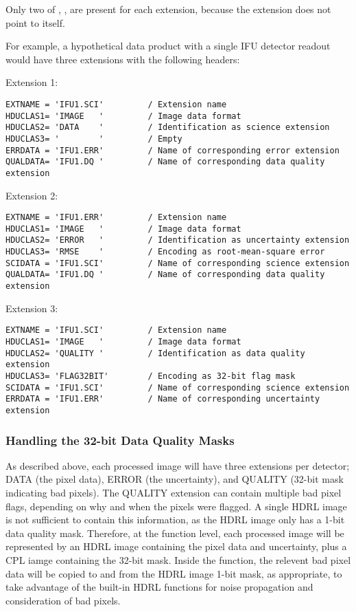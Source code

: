 Only two of , ,  are present for each
extension, because the extension does not point to itself.

For example, a hypothetical data product with a single \ac{IFU} detector
readout would have three extensions with the following headers:

Extension 1:
\begin{verbatim}
EXTNAME = 'IFU1.SCI'         / Extension name
HDUCLAS1= 'IMAGE   '         / Image data format
HDUCLAS2= 'DATA    '         / Identification as science extension
HDUCLAS3= '        '         / Empty
ERRDATA = 'IFU1.ERR'         / Name of corresponding error extension
QUALDATA= 'IFU1.DQ '         / Name of corresponding data quality extension
\end{verbatim}

Extension 2:
\begin{verbatim}
EXTNAME = 'IFU1.ERR'         / Extension name
HDUCLAS1= 'IMAGE   '         / Image data format
HDUCLAS2= 'ERROR   '         / Identification as uncertainty extension
HDUCLAS3= 'RMSE    '         / Encoding as root-mean-square error
SCIDATA = 'IFU1.SCI'         / Name of corresponding science extension
QUALDATA= 'IFU1.DQ '         / Name of corresponding data quality extension
\end{verbatim}

Extension 3:
\begin{verbatim}
EXTNAME = 'IFU1.SCI'         / Extension name
HDUCLAS1= 'IMAGE   '         / Image data format
HDUCLAS2= 'QUALITY '         / Identification as data quality extension
HDUCLAS3= 'FLAG32BIT'        / Encoding as 32-bit flag mask
SCIDATA = 'IFU1.SCI'         / Name of corresponding science extension
ERRDATA = 'IFU1.ERR'         / Name of corresponding uncertainty extension
\end{verbatim}


\subsubsection{Handling the 32-bit Data Quality Masks}
\label{sssec:metisimageformat}


As described above, each processed image will have three extensions per detector; DATA (the pixel data), ERROR (the uncertainty), and QUALITY (32-bit mask indicating bad pixels). The QUALITY extension can contain multiple bad pixel flags, depending on why and when the pixels were flagged.  A single HDRL image is not sufficient to contain this information, as the HDRL image only has a 1-bit data quality mask. Therefore, at the function level, each processed image will be represented by an HDRL image containing the pixel data and uncertainty, plus a CPL iamge containing the 32-bit mask. Inside the function, the relevent bad pixel data will be copied to and from the HDRL image 1-bit mask, as appropriate, to take advantage of the built-in HDRL functions for noise propagation and consideration of bad pixels.

